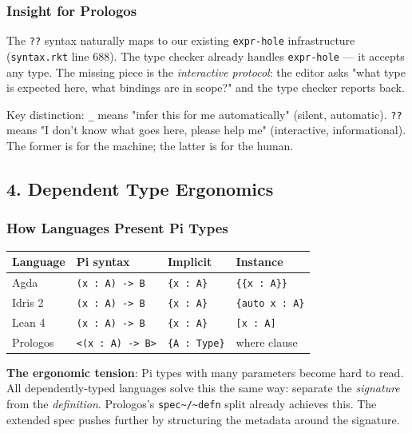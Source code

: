 \documentclass[11pt]{article}
\begin{document}
\subsubsection{Insight for Prologos}
\label{sec:org2e45f04}

The \texttt{??} syntax naturally maps to our existing \texttt{expr-hole} infrastructure
(\texttt{syntax.rkt} line 688). The type checker already handles \texttt{expr-hole} --- it
accepts any type. The missing piece is the \emph{interactive protocol}: the editor
asks "what type is expected here, what bindings are in scope?" and the type
checker reports back.

Key distinction: \texttt{\_} means "infer this for me automatically" (silent, automatic).
\texttt{??} means "I don't know what goes here, please help me" (interactive,
informational). The former is for the machine; the latter is for the human.
\subsection{4. Dependent Type Ergonomics}
\label{sec:orgd0ed6d4}

\subsubsection{How Languages Present Pi Types}
\label{sec:orgbc0ab8a}

\begin{center}
\begin{tabular}{llll}
Language & Pi syntax & Implicit & Instance\\
\hline
Agda & \texttt{(x : A) -> B} & \texttt{\{x : A\}} & \texttt{\{\{x : A\}\}}\\
Idris 2 & \texttt{(x : A) -> B} & \texttt{\{x : A\}} & \texttt{\{auto x : A\}}\\
Lean 4 & \texttt{(x : A) -> B} & \texttt{\{x : A\}} & \texttt{[x : A]}\\
Prologos & \texttt{<(x : A) -> B>} & \texttt{\{A : Type\}} & where clause\\
\end{tabular}
\end{center}

\textbf{The ergonomic tension}: Pi types with many parameters become hard to read.
All dependently-typed languages solve this the same way: separate the
\emph{signature} from the \emph{definition}. Prologos's \texttt{spec\textasciitilde{}/\textasciitilde{}defn} split already
achieves this. The extended spec pushes further by structuring the metadata
around the signature.
\end{document}
